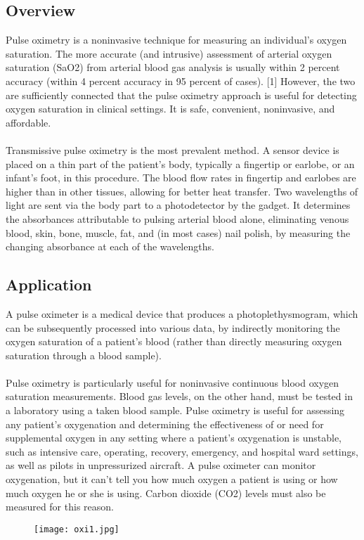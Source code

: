 \documentclass[12pt]{article}
\begin{document}
\subsection{Overview}
Pulse oximetry is a noninvasive technique for measuring an individual's oxygen saturation. The more accurate (and intrusive) assessment of arterial oxygen saturation (SaO2) from arterial blood gas analysis is usually within 2 percent accuracy (within 4 percent accuracy in 95 percent of cases). [1] However, the two are sufficiently connected that the pulse oximetry approach is useful for detecting oxygen saturation in clinical settings. It is safe, convenient, noninvasive, and affordable.
\\
\\
Transmissive pulse oximetry is the most prevalent method. A sensor device is placed on a thin part of the patient's body, typically a fingertip or earlobe, or an infant's foot, in this procedure. The blood flow rates in fingertip and earlobes are higher than in other tissues, allowing for better heat transfer. Two wavelengths of light are sent via the body part to a photodetector by the gadget. It determines the absorbances attributable to pulsing arterial blood alone, eliminating venous blood, skin, bone, muscle, fat, and (in most cases) nail polish, by measuring the changing absorbance at each of the wavelengths.

\subsection{Application}
A pulse oximeter is a medical device that produces a photoplethysmogram, which can be subsequently processed into various data, by indirectly monitoring the oxygen saturation of a patient's blood (rather than directly measuring oxygen saturation through a blood sample).
\\
\\
Pulse oximetry is particularly useful for noninvasive continuous blood oxygen saturation measurements. Blood gas levels, on the other hand, must be tested in a laboratory using a taken blood sample. Pulse oximetry is useful for assessing any patient's oxygenation and determining the effectiveness of or need for supplemental oxygen in any setting where a patient's oxygenation is unstable, such as intensive care, operating, recovery, emergency, and hospital ward settings, as well as pilots in unpressurized aircraft. A pulse oximeter can monitor oxygenation, but it can't tell you how much oxygen a patient is using or how much oxygen he or she is using. Carbon dioxide (CO2) levels must also be measured for this reason.
\\
\begin{figure}[h]
\centering
\texttt{[image: oxi1.jpg]}
\label{fig_oxi1}
\end{figure}
\\
\end{document}
